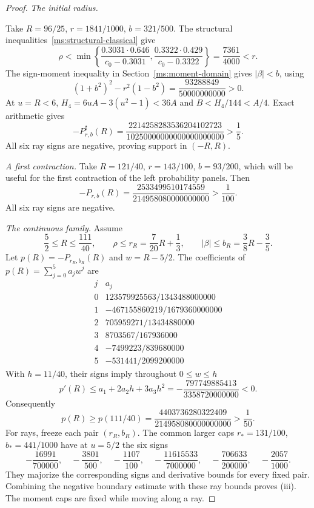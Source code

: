 \begin{proof}
\emph{The initial radius.}

Take $R=96/25$, $r=1841/1000$, $b=321/500$. The structural inequalities~\eqref{ms:structural-classical} give
\[
 \rho<
 \min\left\{\frac{0.3031\cdot0.646}{c_0-0.3031},
              \frac{0.3322\cdot0.429}{c_0-0.3322}\right\}
 =\frac{7361}{4000}<r.
\]
The sign-moment inequality in Section~\ref{ms:moment-domain} gives
$|\beta|<b$, using
\[
 (1+b^2)^2-r^2(1-b^2)=\frac{93288849}{50000000000}>0.
\]
At $u=R<6$,
$H_4=6uA-3(u^2-1)<36A$ and $B<H_4/144<A/4$. Exact arithmetic gives
\[
 -P^\sharp_{r,b}(R)=
 \frac{2214258283536204102723}{10250000000000000000000}>\frac15.
\]
All six ray signs are negative, proving support in $(-R,R)$.

\emph{A first contraction.}
Take $R=121/40$, $r=143/100$, $b=93/200$, which will be useful for the first contraction of the left probability
panels.
Then
\[
 -P_{r,b}(R)=\frac{2533499510174559}{214958080000000000}>\frac1{100}.
\]
All six ray signs are negative.

\emph{The continuous family.} Assume
\[
 \frac52\le R\le\frac{111}{40},\qquad
 \rho\le r_R=\frac7{20}R+\frac13,\qquad
 |\beta|\le b_R=\frac38R-\frac35.
\]
Let $p(R)=-P_{r_R,b_R}(R)$ and $w=R-5/2$. The coefficients of
$p(R)=\sum_{j=0}^5a_jw^j$ are
\[
\begin{array}{c|r}
j&a_j\\ \hline
0&123579925563/1343488000000\\
1&-467155860219/1679360000000\\
2&705959271/13434880000\\
3&8703567/167936000\\
4&-7499223/839680000\\
5&-531441/2099200000
\end{array}
\]
With $h=11/40$, their signs imply throughout $0\le w\le h$
\[
 p'(R)\le a_1+2a_2h+3a_3h^2
       =-\frac{797749885413}{3358720000000}<0.
\]
Consequently
\[
 p(R)\ge p(111/40)
       =\frac{4403736280322409}{214958080000000000}>\frac1{50}.
\]
For rays, freeze each pair $(r_R,b_R)$. The common larger caps
$r_*=131/100$, $b_*=441/1000$ have at $u=5/2$ the six signs
\[
 -\frac{16991}{700000},\quad-\frac{3801}{500},\quad-\frac{1107}{100},
 \quad-\frac{11615533}{7000000},\quad-\frac{706633}{200000},
 \quad-\frac{2057}{1000}.
\]
They majorize the corresponding signs and derivative bounds for every fixed
pair. Combining the negative boundary estimate with these ray bounds proves
\textup{(iii)}. The moment caps are fixed while moving along a ray.
\end{proof}


